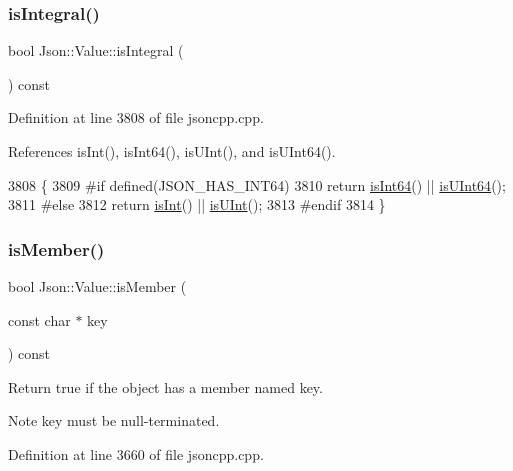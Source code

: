 \subsubsection{\texorpdfstring{is\+Integral()}{isIntegral()}}
{\footnotesize\ttfamily bool Json\+::\+Value\+::is\+Integral (\begin{DoxyParamCaption}{ }\end{DoxyParamCaption}) const}



Definition at line 3808 of file jsoncpp.\+cpp.



References is\+Int(), is\+Int64(), is\+U\+Int(), and is\+U\+Int64().


\begin{DoxyCode}
3808                              \{
3809 \textcolor{preprocessor}{#if defined(JSON\_HAS\_INT64)}
3810   \textcolor{keywordflow}{return} \hyperlink{class_json_1_1_value_a4a81fb3c3acdbb68b2e2f30836a4f53e}{isInt64}() || \hyperlink{class_json_1_1_value_a883576e35cb03a785258edb56777a2de}{isUInt64}();
3811 \textcolor{preprocessor}{#else}
3812   \textcolor{keywordflow}{return} \hyperlink{class_json_1_1_value_aff51d8b52979ca06cf9d909accd5f695}{isInt}() || \hyperlink{class_json_1_1_value_abdda463d3269015f883587349726cfbc}{isUInt}();
3813 \textcolor{preprocessor}{#endif}
3814 \}
\end{DoxyCode}
\mbox{\label{class_json_1_1_value_ad6d4df2227321bab05e86667609a7fad}} 
\subsubsection{\texorpdfstring{is\+Member()}{isMember()}\hspace{0.1cm}{\footnotesize\ttfamily [1/3]}}
{\footnotesize\ttfamily bool Json\+::\+Value\+::is\+Member (\begin{DoxyParamCaption}\item[{const char $\ast$}]{key }\end{DoxyParamCaption}) const}

Return true if the object has a member named key. \begin{DoxyNote}{Note}
\textquotesingle{}key\textquotesingle{} must be null-\/terminated. 
\end{DoxyNote}


Definition at line 3660 of file jsoncpp.\+cpp.



